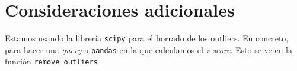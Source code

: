 \documentclass[11pt]{article}
\begin{document}
\pagebreak

\section{Consideraciones adicionales} \label{consideraciones}

Estamos usando la librería \lstinline{scipy} para el borrado de los outliers. En concreto, para hacer una \emph{query} a \lstinline{pandas} en la que calculamos el \emph{z-score}. Esto se ve en la función \lstinline{remove_outliers}


\pagebreak


\end{document}

